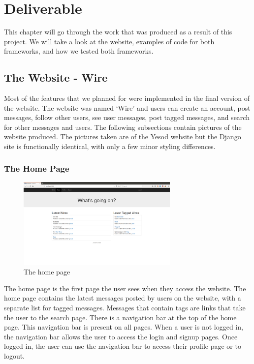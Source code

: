 \chapter{Deliverable}
\label{chap:Deliverable}

This chapter will go through the work that was produced as a result of this
project. We will take a look at the website, examples of code for both frameworks,
and how we tested both frameworks.

\section{The Website - Wire}

Most of the features that we planned for were implemented in the final version
of the website. The website was named `Wire' and users can create an account,
post messages, follow other users, see user messages, post tagged
messages, and search for other messages and users. The following subsections
contain pictures of the website produced. The pictures taken are of the Yesod
website but the Django site is functionally identical, with only a few minor styling
differences.

\subsection{The Home Page}

\begin{figure}[H]
    \centering
    \includegraphics[width=0.7\textwidth]{final_report/pics/home.png}
    \caption{The home page}
    \label{fig:wireHome}
\end{figure}

The home page is the first page the user sees when they access the website.
The home page contains the latest messages posted by users on the website,
with a separate list for tagged messages. Messages that contain tags are links
that take the user to the search page. There is a navigation bar at the top of
the home page. This navigation bar is present on all pages. When a user is not
logged in, the navigation bar allows the user to access the login and signup pages.
Once logged in, the user can use the navigation bar to access their profile page
or to logout.

